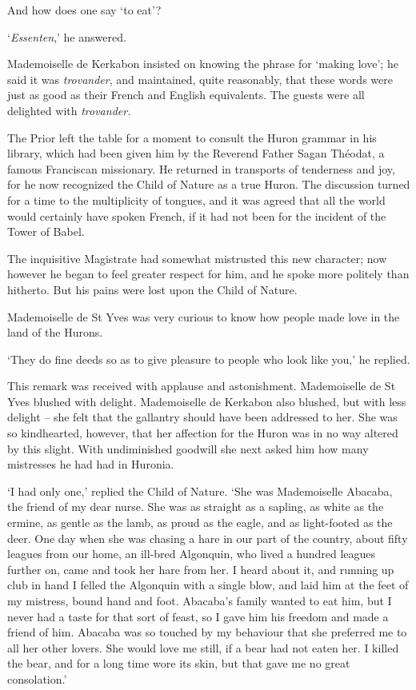 \documentclass{article}
\begin{document}
\begin{center}
And how does one say `to eat'? 

`\textit{Essenten},' he answered. 

Mademoiselle de Kerkabon insisted on knowing the phrase for `making love'; he said 
it was \textit{trovander}, and maintained, quite reasonably, that these words were 
just as good as their French and English equivalents. The guests were all delighted 
with \textit{trovander. }

The Prior left the table for a moment to consult the Huron grammar in his library, 
which had been given him by the Reverend Father Sagan Théodat, a famous Franciscan 
missionary. He returned in transports of tenderness and joy, for he now recognized 
the Child of Nature as a true Huron. The discussion turned for a time to the multiplicity 
of tongues, and it was agreed that all the world would certainly have spoken French, 
if it had not been for the incident of the Tower of Babel. 

The inquisitive Magistrate had somewhat mistrusted this new character; now however 
he began to feel greater respect for him, and he spoke more politely than hitherto. 
But his pains were lost upon the Child of Nature. 

Mademoiselle de St Yves was very curious to know how people made love in the land 
of the Hurons. 

`They do fine deeds so as to give pleasure to people who look like you,' he replied. 

This remark was received with applause and astonishment. Mademoiselle de St Yves 
blushed with delight. Mademoiselle de Kerkabon also blushed, but with less delight 
– she felt that the gallantry should have been addressed to her. She was so kindhearted, 
however, that her affection for the Huron was in no way altered by this slight. 
With undiminished goodwill she next asked him how many mistresses he had had in 
Huronia. 

`I had only one,' replied the Child of Nature. `She was Mademoiselle Abacaba, the 
friend of my dear nurse. She was as straight as a sapling, as white as the ermine, 
as gentle as the lamb, as proud as the eagle, and as light-footed as the deer. 
One day when she was chasing a hare in our part of the country, about fifty leagues 
from our home, an ill-bred Algonquin, who lived a hundred leagues further on, came 
and took her hare from her. I heard about it, and running up club in hand I felled 
the Algonquin with a single blow, and laid him at the feet of my mistress, bound 
hand and foot. Abacaba's family wanted to eat him, but I never had a taste for 
that sort of feast, so I gave him his freedom and made a friend of him. Abacaba 
was so touched by my behaviour that she preferred me to all her other lovers. She 
would love me still, if a bear had not eaten her. I killed the bear, and for a 
long time wore its skin, but that gave me no great consolation.' 


\end{center}
\end{document}
